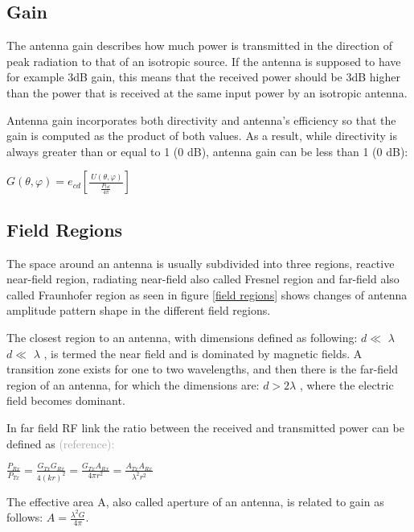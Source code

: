 \subsection{Gain}

The antenna gain describes how much power is transmitted in the direction of peak radiation to that of an isotropic source. If the antenna is supposed to have for example 3dB gain, this means that the received power should be 3dB higher than the power that is received at the same input power by an isotropic antenna.


Antenna gain incorporates both directivity and antenna’s efficiency so that the gain is computed as the product of both values. As a result, while directivity is always greater than or equal to 1 (0 dB), antenna gain can be less than 1 (0 dB): 

\begin{center}
$G \left(  \theta , \varphi  \right) =e_{cd} \left[ \frac{~U \left(  \theta , \varphi  \right) }{\frac{P_{tot}}{4 \pi }} \right]$  
\end{center}  


\subsection{Field Regions}

The space around an antenna is usually subdivided into three regions, reactive near-field region, radiating near-field also called Fresnel region and far-field also called Fraunhofer region as seen in figure \ref{field regions} shows changes of antenna amplitude pattern shape in the different field regions.

The closest region to an antenna, with dimensions defined as following: $d \ll $ $ \lambda $ $d \ll $ $ \lambda $ , is termed the near field and is dominated by magnetic fields. A transition zone exists for one to two wavelengths, and then there is the far-field region of an antenna, for which the dimensions are: $d>2\lambda $  , where the electric field becomes dominant.

In far field RF link the ratio between the received and transmitted power can be defined as \textcolor[HTML]{A6A6A6}{(reference):}

$\frac{P_{Rx}}{P_{Tx}}=\frac{G_{Tx}G_{Rx}}{4 \left( kr \right) ^{2}}=\frac{G_{Tx}A_{Rx}}{4 \pi r^{2}}=\frac{A_{Tx}A_{Rx}}{ \lambda ^{2}r^{2}} $


The effective area A, also called aperture of an antenna, is related to gain as follows:  $ A=\frac{ \lambda ^{2}G}{4 \pi } $.

